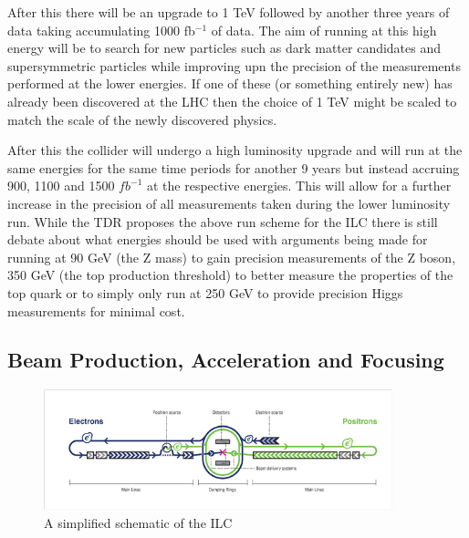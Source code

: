 After this there will be an upgrade to 1 TeV followed by another three years of data taking accumulating 1000 fb${^{-1}}$ of data. The aim of running at this high energy will be to search for new particles such as dark matter candidates and supersymmetric particles while improving upn the precision of the measurements performed at the lower energies. If one of these (or something entirely new) has already been discovered at the \ac{LHC} then the choice of 1 TeV might be scaled to match the scale of the newly discovered physics.

After this the collider will undergo a high luminosity upgrade and will run at the same energies for the same time periods for another 9 years but instead accruing 900, 1100 and 1500 ${fb^{-1}}$ at the respective energies. This will allow for a further increase in the precision of all measurements taken during the lower luminosity run.
While the \ac{TDR} proposes the above run scheme for the \ac{ILC} there is still debate about what energies should be used with arguments being made for running at 90 GeV (the Z mass) to gain precision measurements of the Z boson, 350 GeV (the top production threshold) to better measure the properties of the top quark or to simply only run at 250 GeV to provide precision Higgs measurements for minimal cost.

\subsection{Beam Production, Acceleration and Focusing}
\label{ILC:BEAM}

\begin{figure}
  \centering
  \includegraphics[width=0.9\textwidth,keepaspectratio]{Experiments/fig/ILC_Simplified}
  \caption[Schematic of the ILC accelerator layout]{A simplified schematic of the ILC\cite{ILCTDR}}
  \label{Fig:ILCsimple}
\end{figure}

